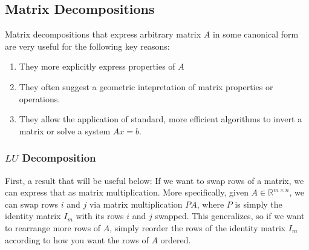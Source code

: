 \documentclass[12pt]{article}
\numberwithin{equation}{section} %
\theoremstyle{plain}
\theoremstyle{definition}
\theoremstyle{remark}
\newcommand{\R}{\mathbb{R}}
\begin{document}
\clearpage
\subsection{Matrix Decompositions}
\label{subsec:decomp}

Matrix decompositions that express arbitrary matrix $A$ in some
canonical form are very useful for the following key reasons:
\begin{enumerate}
  \item They more explicitly express properties of $A$
  \item They often suggest a geometric intepretation of matrix
    properties or operations.
  \item They allow the application of standard, more efficient
    algorithms to invert a matrix or solve a system $Ax=b$.
\end{enumerate}

\subsubsection{$LU$ Decomposition}

First, a result that will be useful below: If we want to swap rows of a
matrix, we can express that as matrix multiplication. More specifically,
given $A\in\R^{m\times n}$, we can swap rows $i$ and $j$ via
matrix multiplication $PA$, where $P$ is simply the identity matrix
$I_m$ with its rows $i$ and $j$ swapped. This generalizes, so if
we want to rearrange more rows of $A$, simply reorder the rows of the
identity matrix $I_m$ according to how you want the rows of $A$ ordered.
\end{document}

